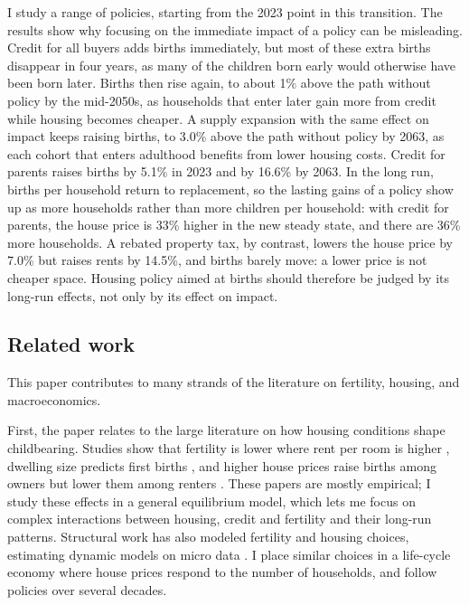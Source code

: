 I study a range of policies, starting from the 2023 point in this transition. The results show why focusing on the immediate impact of a policy can be misleading. Credit for all buyers adds births immediately, but most of these extra births disappear in four years, as many of the children born early would otherwise have been born later. Births then rise again, to about 1\% above the path without policy by the mid-2050s, as households that enter later gain more from credit while housing becomes cheaper. A supply expansion with the same effect on impact keeps raising births, to 3.0\% above the path without policy by 2063, as each cohort that enters adulthood benefits from lower housing costs. Credit for parents
raises births by 5.1\% in 2023 and by 16.6\% by 2063. In the long run,
births per household return to replacement, so the lasting gains of a policy
show up as more households rather than more children per household: with
credit for parents, the house price is 33\% higher in the new steady state,
and there are 36\% more households. A rebated property tax, by contrast,
lowers the house price by 7.0\% but raises rents by 14.5\%, and births
barely move: a lower price is not cheaper space. Housing policy aimed at
births should therefore be judged by its long-run effects, not only by its
effect on impact.

\subsection{Related work}
\label{sec:related-work}

This paper contributes to many strands of the literature on fertility, housing, and macroeconomics.

First, the paper relates to the large literature on how housing conditions shape childbearing. Studies show that fertility is lower where rent per room is higher \citep{simonTamuraHigherRents2009}, dwelling size predicts first births \citep{stromHousingFirstBirths2010}, and higher house prices raise births among owners but lower them among renters \citep{dettlingHousePricesBirth2014,lovenheimFamilyWealthShocks2013}. These papers are mostly empirical; I study these effects in a general equilibrium model, which lets me focus on complex interactions between housing, credit and fertility and their long-run patterns. Structural work has also modeled fertility and housing choices, estimating dynamic models on micro data \citep{khorunzhinaMillerAmericanDream2022,couillardBuildBabyBuild2025}. I place similar choices in a life-cycle economy where house prices respond to the number of households, and follow policies over several decades.

